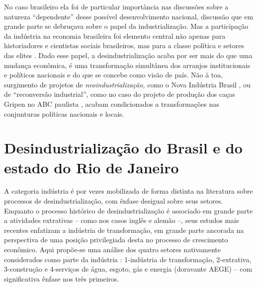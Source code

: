 No caso brasileiro ela foi de particular importância nas discussões
sobre a natureza ``dependente''
\citep{evans_dependent_2018} desse
possível desenvolvimento nacional, discussão que em grande parte se
debruçava sobre o papel da industrialização. Mas a participação da
indústria na economia brasileira foi elemento central não apenas para
historiadores e cientistas sociais brasileiros, mas para a classe
política e setores das elites
\citep{barbosa_developmentalist_2020}. Dado
esse papel, a desindustrialização acaba por ser mais do que uma mudança
econômica, é uma transformação simultânea dos arranjos institucionais e
políticos nacionais e do que se concebe como visão de país. Não à toa,
surgimento de projetos de \emph{neoindustrialização,} como o Nova
Indústria Brasil \citep{cndi_nova_2024}, ou de ``reconversão industrial'', como no caso do
projeto de produção dos caças Gripen no ABC paulista
\citep{ramalhoconceicao2024}, acabam condicionados a transformações nas conjunturas políticas
nacionais e locais.

\section{Desindustrialização do Brasil e do estado do Rio de Janeiro}

A categoria indústria é por vezes mobilizada de forma distinta na
literatura sobre processos de desindustrialização, com ênfase desigual
sobre seus setores. Enquanto o processo histórico de desindustrialização
é associado em grande parte a atividades extrativas -- como nos casos
inglês \citep{tomlinson_-industrialization_2016} e alemão
\citep{berger_burdens_2017} --, seus estudos mais recentes enfatizam a indústria de
transformação, em grande parte ancorada na perspectiva de uma posição
privilegiada desta no processo de crescimento econômico. Aqui propõe-se
uma análise dos quatro setores nativamente considerados como parte da
indústria \citep{cni_sd}: 1-indústria de transformação, 2-extrativa, 3-construção e
4-serviços de água, esgoto, gás e energia (doravante AEGE) -- com
significativa ênfase nos três primeiros.

